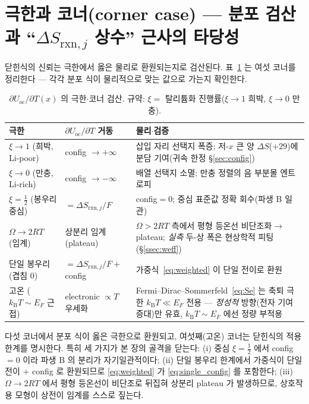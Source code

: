 \documentclass[11pt,a4paper]{article}
\newcommand{\rxn}{\mathrm{rxn}}
\newcommand{\oc}{\mathrm{oc}}
\newcommand{\kB}{k_{\mathrm B}}
\begin{document}
\section{극한과 코너(corner case) — 분포 검산과 ``$\Delta S_{\rxn,j}$ 상수'' 근사의 타당성}\label{sec:limits}
닫힌식의 신뢰는 극한에서 옳은 물리로 환원되는지로 검산된다. 표~\ref{tab:limits} 는 여섯 코너를 정리한다 —
각각 분포 식이 물리적으로 맞는 값으로 가는지 확인한다.

\begin{table}[t]
\centering\small
\renewcommand{\arraystretch}{1.35}
\caption{$\partial U_\oc/\partial T(x)$ 의 극한$\cdot$코너 검산. 규약: $\xi=$ 탈리튬화 진행률($\xi\to1$ 희박, $\xi\to0$ 만충).}
\label{tab:limits}
\begin{tabular}{l l p{}}
\toprule
극한 & $\partial U_\oc/\partial T$ 거동 & 물리$\cdot$검증 \\
\midrule
$\xi\to1$ (희박, Li-poor) & config $\to+\infty$ & 삽입 자리 선택지 폭증; 저-$x$ 큰 양 $\Delta S$($+29$)에 분담 기여(귀속 한정 \S\ref{sec:config}) \\
$\xi\to0$ (만충, Li-rich) & config $\to-\infty$ & 배열 선택지 소멸; 만충 정렬의 음 부분몰 엔트로피 \\
$\xi=\tfrac12$ (봉우리 중심) & $=\Delta S_{\rxn,j}/F$ & config$=0$; 중심 표준값 정확 회수(파생 B 일관) \\
$\Omega\to2RT$ (임계) & 상분리 임계(plateau) & $\Omega>2RT$ 측에서 평형 등온선 비단조화$\to$plateau; \emph{실측} 두-상 폭은 현상학적 피팅(\S\ref{ssec:weff}) \\
단일 봉우리 (겹침 0) & $=\Delta S_{\rxn,j}/F+$ config & 가중식~\eqref{eq:weighted} 이 단일 전이로 환원 \\
고온 ($\kB T\!\sim\!E_F$ 근접) & electronic $\propto T$ 우세화 & Fermi--Dirac--Sommerfeld~\eqref{eq:Se} 는 축퇴 극한 $\kB T\!\ll\!E_F$ 전용 — \emph{정성적} 방향(전자 기여 증대)만 유효, $\kB T\!\sim\!E_F$ 에선 정량 부적용 \\
\bottomrule
\end{tabular}
\end{table}

다섯 코너에서 분포 식이 옳은 극한으로 환원되고, 여섯째(고온) 코너는 닫힌식의 적용 한계를 명시한다.
특히 세 가지가 본 장의 골격을 닫는다: (i) 중심
$\xi=\tfrac12$ 에서 config$=0$ 이라 파생 B 의 분리가 자기일관적이다; (ii) 단일
봉우리 한계에서 가중식이 단일 전이 $+$ config 로 환원되므로 \eqref{eq:weighted} 가 \eqref{eq:single_config} 를
포함한다; (iii) $\Omega\to2RT$ 에서 평형 등온선이 비단조로 뒤집혀 상분리 plateau 가 발생하므로, 상호작용 모형이
상전이 임계를 스스로 짚는다.
\end{document}
